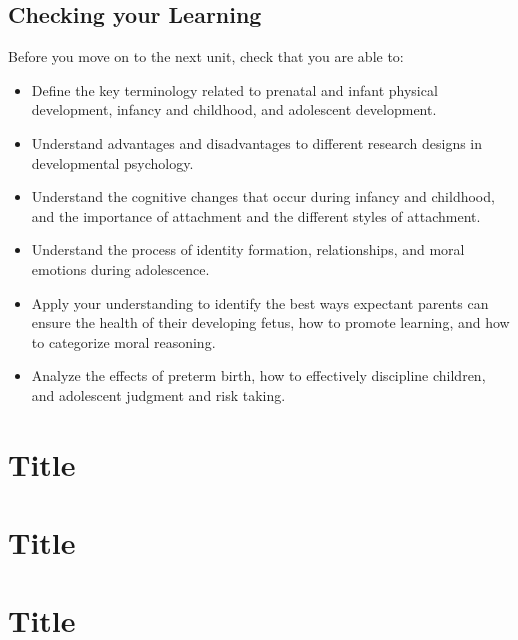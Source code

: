 \documentclass[
]{book}
\providecommand{\tightlist}{%
  \setlength{\itemsep}{0pt}\setlength{\parskip}{0pt}}
\begin{document}
\hypertarget{checking-your-learning-2}{%
\section*{Checking your Learning}\label{checking-your-learning-2}}

\begin{progress}
Before you move on to the next unit, check that you are able to:

\begin{itemize}
\tightlist
\item
  Define the key terminology related to prenatal and infant physical development, infancy and childhood, and adolescent development.\\
\item
  Understand advantages and disadvantages to different research designs in developmental psychology.\\
\item
  Understand the cognitive changes that occur during infancy and childhood, and the importance of attachment and the different styles of attachment.\\
\item
  Understand the process of identity formation, relationships, and moral emotions during adolescence.\\
\item
  Apply your understanding to identify the best ways expectant parents can ensure the health of their developing fetus, how to promote learning, and how to categorize moral reasoning.\\
\item
  Analyze the effects of preterm birth, how to effectively discipline children, and adolescent judgment and risk taking.
\end{itemize}
\end{progress}

\hypertarget{title}{%
\chapter{Title}\label{title}}

\hypertarget{title-1}{%
\chapter{Title}\label{title-1}}

\hypertarget{title-2}{%
\chapter{Title}\label{title-2}}
\end{document}
